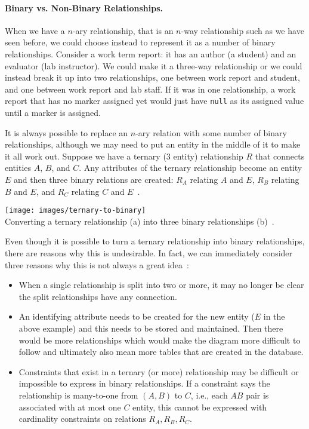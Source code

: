 \documentclass[a4paper]{report}
\begin{document}
\paragraph{Binary vs. Non-Binary Relationships.}
When we have a $n$-ary relationship, that is an $n$-way relationship such as we have seen before, we could choose instead to represent it as a number of binary relationships. Consider a work term report: it has an author (a student) and an evaluator (lab instructor). We could make it a three-way relationship or we could instead break it up into two relationships, one between work report and student, and one between work report and lab staff. If it was in one relationship, a work report that has no marker assigned yet would just have \texttt{null} as its assigned value until a marker is assigned.  

It is always possible to replace an $n$-ary relation with some number of binary relationships, although we may need to put an entity in the middle of it to make it all work out. Suppose we have a ternary (3 entity) relationship $R$ that connects entities $A$, $B$, and $C$. Any attributes of the ternary relationship become an entity $E$ and then three binary relations are created: $R_{A}$ relating $A$ and $E$, $R_{B}$ relating $B$ and $E$, and $R_{C}$ relating $C$ and $E$~\cite{dsc}.

\begin{center}
\texttt{[image: images/ternary-to-binary]}\\
Converting a ternary relationship (a) into three binary relationships (b)~\cite{dsc}.
\end{center}

Even though it is possible to turn a ternary relationship into binary relationships, there are reasons why this is undesirable. In fact, we can immediately consider three reasons why this is not always a great idea~\cite{dsc}:

\begin{itemize}
	\item When a single relationship is split into two or more, it may no longer be clear the split relationships have any connection. 
	\item An identifying attribute needs to be created for the new entity ($E$ in the above example) and this needs to be stored and maintained. Then there would be more relationships which would make the diagram more difficult to follow and ultimately also mean more tables that are created in the database.
	\item Constraints that exist in a ternary (or more) relationship may be difficult or impossible to express in binary relationships. If a constraint says the relationship is many-to-one from $(A, B)$ to $C$, i.e., each $AB$ pair is associated with at most one $C$ entity, this cannot be expressed with cardinality constraints on relations $R_{A}, R_{B}, R_{C}$.
\end{itemize}
\end{document}
